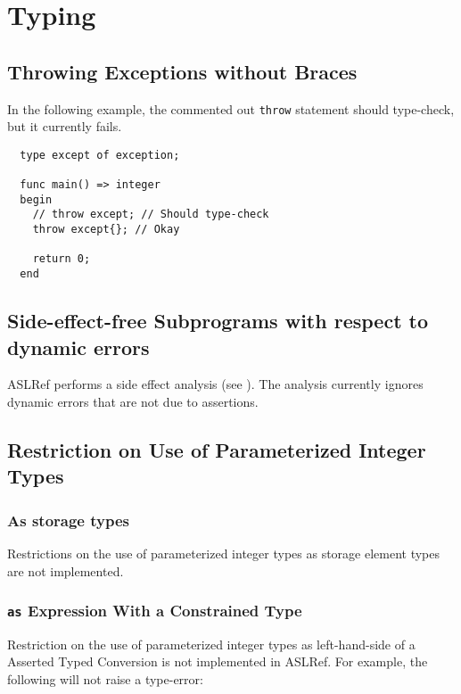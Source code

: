 \section{Typing}

\subsection{Throwing Exceptions without Braces}
In the following example, the commented out \texttt{throw} statement should type-check,
but it currently fails.

\begin{verbatim}
  type except of exception;

  func main() => integer
  begin
    // throw except; // Should type-check
    throw except{}; // Okay

    return 0;
  end
\end{verbatim}

\subsection{Side-effect-free Subprograms with respect to dynamic errors}
ASLRef performs a side effect analysis (see ).
The analysis currently ignores dynamic errors that are not due to assertions.

\subsection{Restriction on Use of Parameterized Integer Types}

\subsubsection{As storage types}
Restrictions on the use of parameterized integer types as storage element types are not
implemented.


\subsubsection{\texttt{as} Expression With a Constrained Type}

Restriction on the use of parameterized integer types as left-hand-side of a
Asserted Typed Conversion is not implemented in ASLRef.
%
For example, the following will not raise a type-error:

